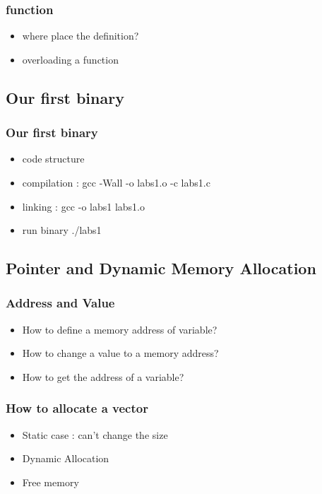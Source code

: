 \documentclass{beamer}
\begin{document}
\begin{frame}
  \frametitle{function}
	\begin{itemize}
		\item where place the definition?
		\item overloading a function
	\end{itemize}
\end{frame}

\subsection{Our first binary}
\label{sub:first_programm}

\begin{frame}
  \frametitle{Our first binary}
	\begin{itemize}
		\item code structure
		\item compilation : gcc  -Wall  -o labs1.o   -c labs1.c
		\item linking : gcc -o labs1  labs1.o
		\item run binary ./labs1
	\end{itemize}
\end{frame}

\subsection{Pointer and Dynamic Memory Allocation}
\label{sub:pointer_and_dynamic_memory_allocation}

\begin{frame}
  \frametitle{Address and Value}
	\begin{itemize}
		\item How to define a memory address of variable?
		\item How to change a value to a memory address?
		\item How to get the address of a variable?
	\end{itemize}
\end{frame}

\begin{frame}
  \frametitle{How to allocate a vector}
	\begin{itemize}
		\item Static case : can't change the size
		\item Dynamic Allocation
		\item Free memory
	\end{itemize}
\end{frame}
\end{document}
